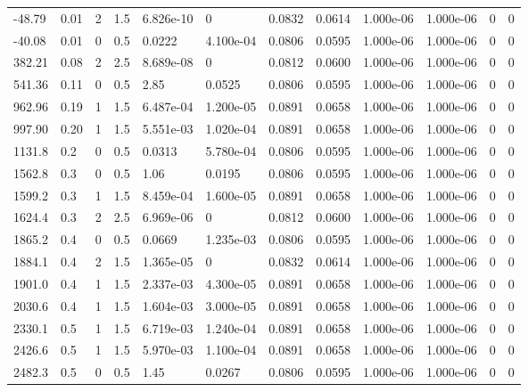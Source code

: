 \documentclass[preview]{standalone}
\begin{document}
{{\begin{tabular}{L{1.2cm}C{1.2cm} C{0.3cm}C{0.5cm} C{1.4cm}C{1.4cm} C{1.4cm}C{1.4cm} C{1.6cm}C{1.6cm} C{1.6cm}C{1.6cm}}
  -48.79  &  0.01  & 2     & 1.5 &  6.826e-10  & 0  &  0.0832&   0.0614& 1.000e-06 & 1.000e-06   &  0 & 0  \\ 
  -40.08  &  0.01  & 0     & 0.5 &  0.0222  & 4.100e-04  &  0.0806&   0.0595& 1.000e-06 & 1.000e-06   &  0 & 0  \\ 
  382.21  &  0.08  & 2     & 2.5 &  8.689e-08  & 0  &  0.0812&   0.0600& 1.000e-06 & 1.000e-06   &  0 & 0  \\ 
  541.36  &  0.11  & 0     & 0.5 &  2.85  & 0.0525  &  0.0806&   0.0595& 1.000e-06 & 1.000e-06   &  0 & 0  \\ 
  962.96  &  0.19  & 1     & 1.5 &  6.487e-04  & 1.200e-05  &  0.0891&   0.0658& 1.000e-06 & 1.000e-06   &  0 & 0  \\ 
  997.90  &  0.20  & 1     & 1.5 &  5.551e-03  & 1.020e-04  &  0.0891&   0.0658& 1.000e-06 & 1.000e-06   &  0 & 0  \\ 
  1131.8  &   0.2  & 0     & 0.5 &  0.0313  & 5.780e-04  &  0.0806&   0.0595& 1.000e-06 & 1.000e-06   &  0 & 0  \\ 
  1562.8  &   0.3  & 0     & 0.5 &  1.06  & 0.0195  &  0.0806&   0.0595& 1.000e-06 & 1.000e-06   &  0 & 0  \\ 
  1599.2  &   0.3  & 1     & 1.5 &  8.459e-04  & 1.600e-05  &  0.0891&   0.0658& 1.000e-06 & 1.000e-06   &  0 & 0  \\ 
  1624.4  &   0.3  & 2     & 2.5 &  6.969e-06  & 0  &  0.0812&   0.0600& 1.000e-06 & 1.000e-06   &  0 & 0  \\ 
  1865.2  &   0.4  & 0     & 0.5 &  0.0669  & 1.235e-03  &  0.0806&   0.0595& 1.000e-06 & 1.000e-06   &  0 & 0  \\ 
  1884.1  &   0.4  & 2     & 1.5 &  1.365e-05  & 0  &  0.0832&   0.0614& 1.000e-06 & 1.000e-06   &  0 & 0  \\ 
  1901.0  &   0.4  & 1     & 1.5 &  2.337e-03  & 4.300e-05  &  0.0891&   0.0658& 1.000e-06 & 1.000e-06   &  0 & 0  \\ 
  2030.6  &   0.4  & 1     & 1.5 &  1.604e-03  & 3.000e-05  &  0.0891&   0.0658& 1.000e-06 & 1.000e-06   &  0 & 0  \\ 
  2330.1  &   0.5  & 1     & 1.5 &  6.719e-03  & 1.240e-04  &  0.0891&   0.0658& 1.000e-06 & 1.000e-06   &  0 & 0  \\ 
  2426.6  &   0.5  & 1     & 1.5 &  5.970e-03  & 1.100e-04  &  0.0891&   0.0658& 1.000e-06 & 1.000e-06   &  0 & 0  \\ 
  2482.3  &   0.5  & 0     & 0.5 &  1.45  & 0.0267  &  0.0806&   0.0595& 1.000e-06 & 1.000e-06   &  0 & 0  \\ 

\end{tabular}}}
\end{document}
